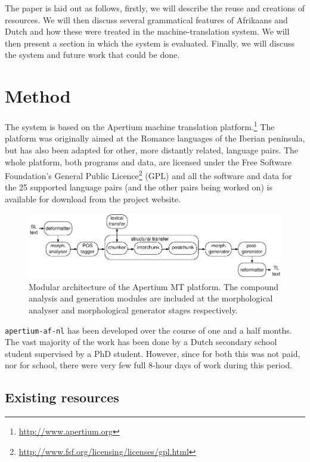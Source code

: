 \documentclass[11pt]{article}
\begin{document}
The paper is laid out as follows, firstly, we will describe the reuse and creations of 
resources. We will then discuss several grammatical features of Afrikaans and Dutch and how 
these were treated in the machine-translation system. We will then present a section 
in which the system is evaluated. Finally, we will discuss the system and future work that 
could be done.

\section{Method}

The system is based on the Apertium machine translation platform.\footnote{\url{http://www.apertium.org}} The
platform was originally aimed at the Romance languages of the Iberian
peninsula, but has also been adapted for other, more distantly related,
language pairs. The whole platform, both programs and data, are licensed
under the Free Software Foundation's General Public
Licence\footnote{\url{http://www.fsf.org/licensing/licenses/gpl.html}} (GPL)
and all the software and data for the 25 supported language pairs (and the
other pairs being worked on) is available for download from the project
website.

\begin{figure}
  \centering
  \includegraphics[scale=0.8]{apertium2.pdf}
  \caption{Modular architecture of the Apertium MT
    platform. The compound analysis and generation modules are included at the morphological
    analyser and morphological generator stages respectively.}
\label{fg:apertium}
\end{figure}

{\small {\tt apertium-af-nl}} has been developed over the course of one and a half months.
The vast majority of the work has been done by a Dutch secondary school student supervised 
by a PhD student. However, since for both this was not paid, nor for school, there were 
very few full 8-hour days of work during this period.

\subsection{Existing resources}
\end{document}
